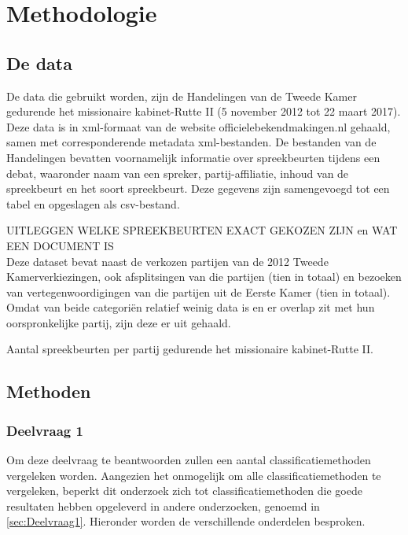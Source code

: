 \section{Methodologie}
\label{sec:meth}


\subsection{De data}
De data die gebruikt worden, zijn de Handelingen van de Tweede Kamer gedurende het missionaire kabinet-Rutte II (5 november 2012 tot 22 maart 2017). Deze data is in xml-formaat van de website officielebekendmakingen.nl gehaald, samen met corresponderende metadata xml-bestanden. De bestanden van de Handelingen bevatten voornamelijk informatie over spreekbeurten tijdens een debat, waaronder naam van een spreker, partij-affiliatie, inhoud van de spreekbeurt en het soort spreekbeurt. Deze gegevens zijn samengevoegd tot een tabel en opgeslagen als csv-bestand.\par
UITLEGGEN WELKE SPREEKBEURTEN EXACT GEKOZEN ZIJN en WAT EEN DOCUMENT IS\\
Deze dataset bevat naast de verkozen partijen van de 2012 Tweede Kamerverkiezingen, ook afsplitsingen van die partijen (tien in totaal) en bezoeken van vertegenwoordigingen van die partijen uit de Eerste Kamer (tien in totaal). Omdat van beide categori\"{e}n relatief weinig data is en er overlap zit met hun oorspronkelijke partij, zijn deze er uit gehaald.
\begin{table}[H]
\caption{Aantal spreekbeurten per partij gedurende het missionaire kabinet-Rutte II.}
\centering

\end{table}




\pagebreak
\subsection{Methoden}


\subsubsection{Deelvraag 1}

Om deze deelvraag te beantwoorden zullen een aantal classificatiemethoden vergeleken worden. Aangezien het onmogelijk om alle classificatiemethoden te vergeleken, beperkt dit onderzoek zich tot classificatiemethoden die goede resultaten hebben opgeleverd in andere onderzoeken, genoemd in \ref{sec:Deelvraag1}. Hieronder worden de verschillende onderdelen besproken.

